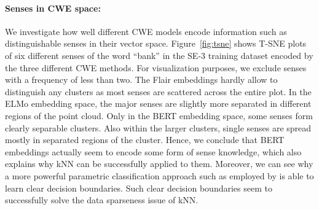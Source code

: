 \documentclass[11pt]{article}
\begin{document}
\begin{figure*}[ht]\centering
{}
\caption{T-SNE plots of different senses of `bank' and their contextualized embeddings. The legend shows a short description of the respective WordNet sense and the frequency of occurrence in the training data. Here, the SE-3 training dataset is used.}
\label{fig:tsne}
\end{figure*}
\paragraph{Senses in CWE space:}We investigate how well different CWE models encode information such as distinguishable senses in their vector space.
Figure~\ref{fig:tsne} shows T-SNE plots~\cite{vanDerMaaten2008} of six different senses of the word ``bank'' in the \mbox{SE-3} training dataset encoded by the three different CWE methods. For visualization purposes, we exclude senses with a frequency of less than two.
The Flair embeddings hardly allow to distinguish any clusters as most senses are scattered across the entire plot. 
In the ELMo embedding space, the major senses are slightly more separated in different regions of the point cloud.
Only in the BERT embedding space, some senses form clearly separable clusters.
Also within the larger clusters, single senses are spread mostly in separated regions of the cluster.
Hence, we conclude that BERT embeddings actually seem to encode some form of sense knowledge, which also explains why kNN can be successfully applied to them. 
Moreover, we can see why a more powerful parametric classification approach such as employed by  is able to learn clear decision boundaries.
Such clear decision boundaries seem to successfully solve the data sparseness issue of kNN.
\end{document}
